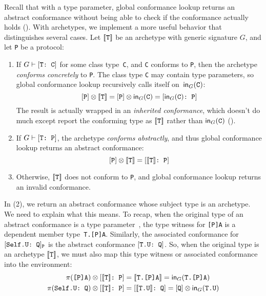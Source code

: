 \documentclass[../generics]{subfiles}
\begin{document}
Recall that with a type parameter, global conformance lookup returns an abstract conformance without being able to check if the conformance actually holds (). With archetypes, we implement a more useful behavior that distinguishes several cases. Let $[\![\texttt{T}]\!]$ be an archetype with generic signature $G$, and let \texttt{P} be a protocol:
\begin{enumerate}
\item If $G\vdash[\texttt{T:~C}]$ for some class type~\texttt{C}, and \texttt{C} conforms to \texttt{P}, then the archetype \emph{conforms concretely} to \texttt{P}. The class type \texttt{C} may contain type parameters, so global conformance lookup recursively calls itself on~$\mathsf{in}_G(\texttt{C})$:
\[[\texttt{P}]\otimes[\![\texttt{T}]\!]=[\texttt{P}]\otimes\mathsf{in}_G(\texttt{C})=[\texttt{$\mathsf{in}_G(\texttt{C})$:~P}]\]
The result is actually wrapped in an \emph{inherited conformance}, which doesn't do much except report the conforming type as $[\![\texttt{T}]\!]$ rather than $\mathsf{in}_G(\texttt{C})$ ().
\item If $G\vdash[\texttt{T:~P}]$, the archetype \emph{conforms abstractly}, and thus global conformance lookup returns an abstract conformance:
\[[\texttt{P}]\otimes[\![\texttt{T}]\!]=[\texttt{$[\![\texttt{T}]\!]$:~P}]\]
\item Otherwise, $[\![\texttt{T}]\!]$ does not conform to \texttt{P}, and global conformance lookup returns an invalid conformance.
\end{enumerate}
In (2), we return an abstract conformance whose subject type is an archetype. We need to explain what this means. To recap, when the original type of an abstract conformance is a type parameter~\tT, the type witness for \texttt{[P]A} is a dependent member type~\texttt{T.[P]A}. Similarly, the associated conformance for $[\texttt{Self.U:~Q}]_{\texttt{P}}$ is the abstract conformance $[\texttt{T.U:~Q}]$. So, when the original type is an archetype $[\![\texttt{T}]\!]$, we must also map this type witness or associated conformance into the environment:
\begin{align*}
\AssocType{[P]A}\otimes \ConfReq{$\archetype{T}$}{P} &=\archetype{T.[P]A}= \MapIn(\texttt{T.[P]A})\\
\AssocConf{Self.U}{Q}\otimes \ConfReq{$\archetype{T}$}{P} &=\ConfReq{$\archetype{T.U}$}{Q}= \protosym{Q}\otimes\MapIn(\texttt{T.U})
\end{align*}
\end{document}
